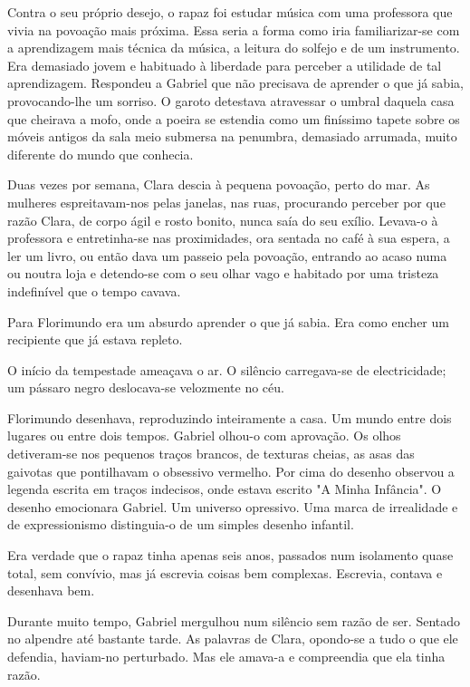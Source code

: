 Contra o seu próprio desejo, o rapaz foi estudar música com uma
professora que vivia na povoação mais próxima. Essa seria a forma como
iria familiarizar-se com a aprendizagem mais técnica da música, a
leitura do solfejo e de um instrumento. Era demasiado jovem e habituado
à liberdade para perceber a utilidade de tal aprendizagem. Respondeu a
Gabriel que não precisava de aprender o que já sabia, provocando-lhe um
sorriso. O garoto detestava atravessar o umbral daquela casa que
cheirava a mofo, onde a poeira se estendia como um finíssimo tapete
sobre os móveis antigos da sala meio submersa na penumbra, demasiado
arrumada, muito diferente do mundo que conhecia.

Duas vezes por semana, Clara descia à pequena povoação, perto do mar. As
mulheres espreitavam-nos pelas janelas, nas ruas, procurando perceber
por que razão Clara, de corpo ágil e rosto bonito, nunca saía do seu
exílio. Levava-o à professora e entretinha-se nas proximidades, ora
sentada no café à sua espera, a ler um livro, ou então dava um passeio
pela povoação, entrando ao acaso numa ou noutra loja e detendo-se com o
seu olhar vago e habitado por uma tristeza indefinível que o tempo
cavava.

Para Florimundo era um absurdo aprender o que já sabia. Era como encher
um recipiente que já estava repleto.

O início da tempestade ameaçava o ar. O silêncio carregava-se de
electricidade; um pássaro negro deslocava-se velozmente no céu.

Florimundo desenhava, reproduzindo inteiramente a casa. Um mundo entre
dois lugares ou entre dois tempos. Gabriel olhou-o com aprovação. Os
olhos detiveram-se nos pequenos traços brancos, de texturas cheias, as
asas das gaivotas que pontilhavam o obsessivo vermelho. Por cima do
desenho observou a legenda escrita em traços indecisos, onde estava
escrito "A Minha Infância". O desenho emocionara Gabriel. Um universo
opressivo. Uma marca de irrealidade e de expressionismo distinguia-o de
um simples desenho infantil.

Era verdade que o rapaz tinha apenas seis anos, passados num isolamento
quase total, sem convívio, mas já escrevia coisas bem complexas.
Escrevia, contava e desenhava bem.

Durante muito tempo, Gabriel mergulhou num silêncio sem razão de ser.
Sentado no alpendre até bastante tarde. As palavras de Clara, opondo-se
a tudo o que ele defendia, haviam-no perturbado. Mas ele amava-a e
compreendia que ela tinha razão.

